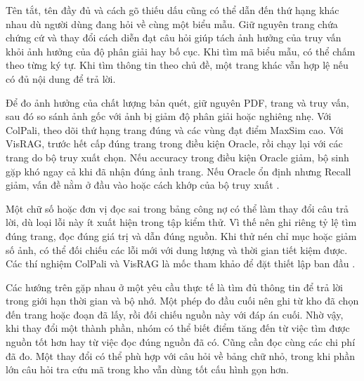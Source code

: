 Tên tắt, tên đầy đủ và cách gõ thiếu dấu cũng có thể dẫn đến thứ hạng khác nhau dù người dùng đang hỏi về cùng một biểu mẫu. Giữ nguyên trang chứa chứng cứ và thay đổi cách diễn đạt câu hỏi giúp tách ảnh hưởng của truy vấn khỏi ảnh hưởng của độ phân giải hay bố cục. Khi tìm mã biểu mẫu, có thể chấm theo từng ký tự. Khi tìm thông tin theo chủ đề, một trang khác vẫn hợp lệ nếu có đủ nội dung để trả lời.

Để đo ảnh hưởng của chất lượng bản quét, giữ nguyên PDF, trang và truy
vấn, sau đó so sánh ảnh gốc với ảnh bị giảm độ phân giải hoặc nghiêng nhẹ.
Với ColPali, theo dõi thứ hạng trang đúng và các vùng đạt điểm MaxSim cao.
Với VisRAG, trước hết cấp đúng trang trong điều kiện Oracle, rồi chạy lại
với các trang do bộ truy xuất chọn. Nếu accuracy trong điều kiện Oracle
giảm, bộ sinh gặp khó ngay cả khi đã nhận đúng ảnh trang. Nếu Oracle ổn
định nhưng Recall giảm, vấn đề nằm ở đầu vào hoặc cách khớp của bộ truy
xuất \cite{faysse2025colpali,yu2025visrag}.

Một chữ số hoặc đơn vị đọc sai trong bảng công nợ có thể làm thay đổi
câu trả lời, dù loại lỗi này ít xuất hiện trong tập kiểm thử. Vì thế nên
ghi riêng tỷ lệ tìm đúng trang, đọc đúng giá trị và dẫn đúng nguồn.
Khi thử nén chỉ mục hoặc giảm số ảnh, có thể đối chiếu các lỗi mới với
dung lượng và thời gian tiết kiệm được. Các thí nghiệm ColPali và VisRAG
là mốc tham khảo để đặt thiết lập ban đầu
\cite{faysse2025colpali,yu2025visrag}.

Các hướng trên gặp nhau ở một yêu cầu thực tế là tìm đủ thông tin để trả lời trong giới hạn thời gian và bộ nhớ. Một phép đo đầu cuối nên ghi từ kho đã chọn đến trang hoặc đoạn đã lấy, rồi đối chiếu nguồn này với đáp án cuối. Nhờ vậy, khi thay đổi một thành phần, nhóm có thể biết điểm tăng đến từ việc tìm được nguồn tốt hơn hay từ việc đọc đúng nguồn đã có. Cũng cần đọc cùng các chi phí đã đo. Một thay đổi có thể phù hợp với câu hỏi về bảng chữ nhỏ, trong khi phần lớn câu hỏi tra cứu mã trong kho vẫn dùng tốt cấu hình gọn hơn.